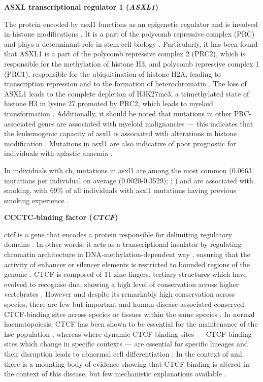 \noindent \textbf{ASXL transcriptional regulator 1 (\textit{ASXL1})}

The protein encoded by \ac{asxl1} functions as an epigenetic regulator and is involved in histone modifications \cite{Fisher2003-eh}. It is a part of the polycomb repressive complex (PRC) and plays a determinant role in stem cell biology \cite{Avgustinova2016-uz}. Particularly, it has been found that ASXL1 is a part of the polycomb repressive complex 2 (PRC2), which is responsible for the methylation of histone H3, and polycomb repressive complex 1 (PRC1), responsible for the ubiquitination of histone H2A, leading to transcription repression and to the formation of heterochromatin \cite{Schwartz2013-fg,Bowman2018-cd}. The loss of ASXL1 leads to the complete depletion of H3K27me3, a trimethylated state of histone H3 in lysine 27 promoted by PRC2, which leads to myeloid transformation \cite{Abdel-Wahab2012-xt}. Additionally, it should be noted that mutations in other PRC-associated genes are associated with myeloid malignancies --- this indicates that the leukemogenic capacity of \ac{asxl1} is associated with alterations in histone modification  \cite{Haferlach2014-bh,Fujino2020-kc}. Mutations in \ac{asxl1} are also indicative of poor prognostic for individuals with aplastic anaemia \cite{Yoshizato2015-th}.

In individuals with \ac{ch}, mutations in \ac{asxl1} are among the most common \cite{Jaiswal2014-rl,Genovese2014-eu,Zink2017-zi,Bolton2020-ct,Coombs2017-ph,Acuna-Hidalgo2017-ng,Desai2018-pj,Young2016-du,Young2019-rz} (0.0663 mutations per individual on average (0.0020-0.3529); ; ) and are associated with smoking, with 69\% of all individuals with \ac{asxl1} mutations having previous smoking experience \cite{Dawoud2020-af}. 

\noindent \textbf{CCCTC-binding factor (\textit{CTCF})}

\Ac{ctcf} is a gene that encodes a protein responsible for delimiting regulatory domains \cite{Jeong2004-xv}. In other words, it acts as a transcriptional insulator by regulating chromatin architecture in DNA-methylation-dependent way \cite{Wang2012-gj}, ensuring that the activity of enhancer or silencer elements is restricted to bounded regions of the genome \cite{Kuhn2003-zj}. CTCF is composed of 11 zinc fingers, tertiary structures which have evolved to recognise \ac{dna}, showing a high level of conservation across higher vertebrates \cite{Filippova1996-lz}. However and despite its remarkably high conservation across species, there are few but important and human disease-associated conserved CTCF-binding sites across species \cite{Martin2011-iz} or tissues within the same species \cite{Azazi2020-lr}. In normal haematopoiesis, CTCF has been shown to be essential for the maintenance of the \ac{hsc} population \cite{Kim2017-of}, whereas where dynamic CTCF-binding sites --- CTCF-binding sites which change in specific contexts --- are essential for specific lineages and their disruption leads to abnormal cell differentiation \cite{Qi2021-do}. In the context of \ac{aml}, there is a mounting body of evidence showing that CTCF-binding is altered in the context of this disease, but few mechanistic explanations available \cite{Qiu2020-wn}.

